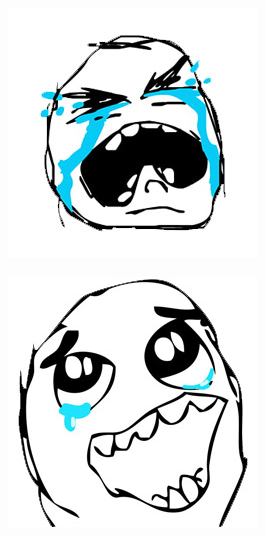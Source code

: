 \begin{multicols}{8}
\begin{center}
\includegraphics[width=\linewidth]{./IMG-GIT/MEMES/Meme-Faces-8.jpg}
\end{center}

\begin{center}
\includegraphics[width=\linewidth]{./IMG-GIT/MEMES/Meme-cara-lloron-1.jpg}       
\end{center}


\end{multicols}
